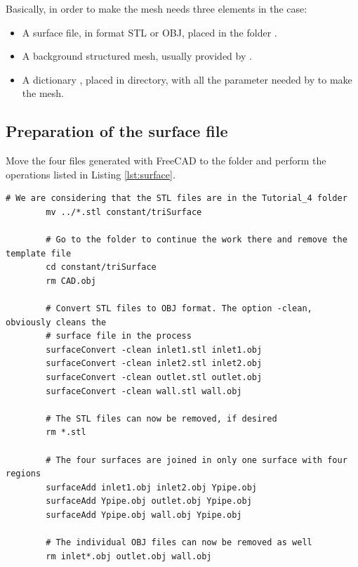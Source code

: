 \documentclass[
parskip=half,      %
DIV=12,            %
headings=normal,   %
fontsize=11pt,     %
english            %
]{scrartcl}
\begin{document}
	Basically, in order to make the mesh  needs three elements in the 
	case:
	\begin{itemize}
		\item A surface file, in format STL or OBJ, placed in the folder
		.
		\item A background structured mesh, usually provided by .
		\item A dictionary , placed in  directory, 
		with all the parameter needed by  to make the mesh.
	\end{itemize}
	
	\subsection{Preparation of the surface file}
	
	Move the four  files generated with FreeCAD to the  folder and perform the operations listed 
	in Listing \ref{lst:surface}.
	
	\begin{lstlisting}[style=terminal, caption={Preparation of the surface file.}, 
		label={lst:surface}]
		# We are considering that the STL files are in the Tutorial_4 folder
		mv ../*.stl constant/triSurface
		
		# Go to the folder to continue the work there and remove the template file
		cd constant/triSurface
		rm CAD.obj
		
		# Convert STL files to OBJ format. The option -clean, obviously cleans the 
		# surface file in the process
		surfaceConvert -clean inlet1.stl inlet1.obj
		surfaceConvert -clean inlet2.stl inlet2.obj
		surfaceConvert -clean outlet.stl outlet.obj
		surfaceConvert -clean wall.stl wall.obj
		
		# The STL files can now be removed, if desired
		rm *.stl
		
		# The four surfaces are joined in only one surface with four regions
		surfaceAdd inlet1.obj inlet2.obj Ypipe.obj
		surfaceAdd Ypipe.obj outlet.obj Ypipe.obj
		surfaceAdd Ypipe.obj wall.obj Ypipe.obj
		
		# The individual OBJ files can now be removed as well
		rm inlet*.obj outlet.obj wall.obj
		
	\end{lstlisting}
	
	
\end{document}
